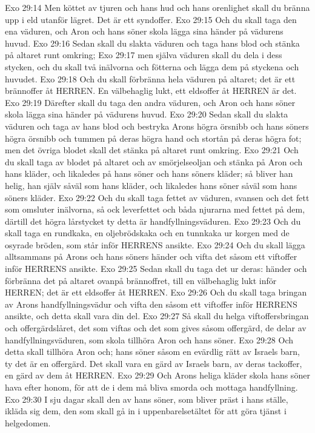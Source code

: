 Exo 29:14  Men köttet av tjuren och hans hud och hans orenlighet skall du bränna upp i eld utanför lägret. Det är ett syndoffer.
Exo 29:15  Och du skall taga den ena väduren, och Aron och hans söner skola lägga sina händer på vädurens huvud.
Exo 29:16  Sedan skall du slakta väduren och taga hans blod och stänka på altaret runt omkring;
Exo 29:17  men själva väduren skall du dela i dess stycken, och du skall två inälvorna och fötterna och lägga dem på styckena och huvudet.
Exo 29:18  Och du skall förbränna hela väduren på altaret; det är ett brännoffer åt HERREN. En välbehaglig lukt, ett eldsoffer åt HERREN är det.
Exo 29:19  Därefter skall du taga den andra väduren, och Aron och hans söner skola lägga sina händer på vädurens huvud.
Exo 29:20  Sedan skall du slakta väduren och taga av hans blod och bestryka Arons högra örsnibb och hans söners högra örsnibb och tummen på deras högra hand och stortån på deras högra fot; men det övriga blodet skall det stänka på altaret runt omkring.
Exo 29:21  Och du skall taga av blodet på altaret och av smörjelseoljan och stänka på Aron och hans kläder, och likaledes på hans söner och hans söners kläder; så bliver han helig, han själv såväl som hans kläder, och likaledes hans söner såväl som hans söners kläder.
Exo 29:22  Och du skall taga fettet av väduren, svansen och det fett som omsluter inälvorna, så ock leverfettet och båda njurarna med fettet på dem, därtill det högra lårstycket ty detta är handfyllningsväduren.
Exo 29:23  Och du skall taga en rundkaka, en oljebrödskaka och en tunnkaka ur korgen med de osyrade bröden, som står inför HERRENS ansikte.
Exo 29:24  Och du skall lägga alltsammans på Arons och hans söners händer och vifta det såsom ett viftoffer inför HERRENS ansikte.
Exo 29:25  Sedan skall du taga det ur deras: händer och förbränna det på altaret ovanpå brännoffret, till en välbehaglig lukt inför HERREN; det är ett eldsoffer åt HERREN.
Exo 29:26  Och du skall taga bringan av Arons handfyllningsvädur och vifta den såsom ett viftoffer inför HERRENS ansikte, och detta skall vara din del.
Exo 29:27  Så skall du helga viftoffersbringan och offergärdslåret, det som viftas och det som gives såsom offergärd, de delar av handfyllningsväduren, som skola tillhöra Aron och hans söner.
Exo 29:28  Och detta skall tillhöra Aron och; hans söner såsom en evärdlig rätt av Israels barn, ty det är en offergärd. Det skall vara en gärd av Israels barn, av deras tackoffer, en gärd av dem åt HERREN.
Exo 29:29  Och Arons heliga kläder skola hans söner hava efter honom, för att de i dem må bliva smorda och mottaga handfyllning.
Exo 29:30  I sju dagar skall den av hans söner, som bliver präst i hans ställe, ikläda sig dem, den som skall gå in i uppenbarelsetältet för att göra tjänst i helgedomen.
